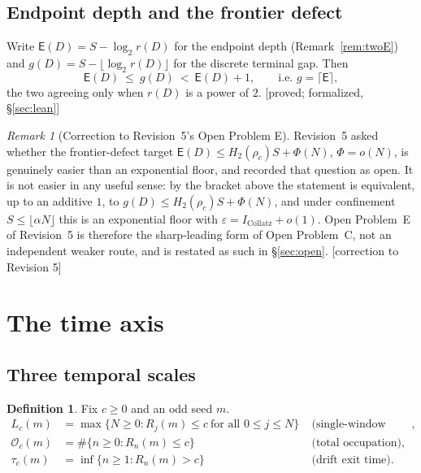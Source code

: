 \documentclass[11pt]{article}
\theoremstyle{plain}
\theoremstyle{definition}
\newtheorem{definition}[theorem]{Definition}
\theoremstyle{remark}
\newtheorem{remark}[theorem]{Remark}
\newcommand{\Occ}{\mathcal{O}}
\newcommand{\Edep}{\mathsf{E}}          %
\newcommand{\al}{\alpha}
\newcommand{\status}[1]{\textsf{\footnotesize[#1]}}
\begin{document}
\subsection{Endpoint depth and the frontier defect}\label{sec:gap}

Write $\Edep(D)=S-\log_2 r(D)$ for the endpoint depth (Remark~\ref{rem:twoE}) and
$g(D)=S-\lfloor\log_2 r(D)\rfloor$ for the discrete terminal gap. Then
\[
\Edep(D)\ \le\ g(D)\ <\ \Edep(D)+1,\qquad\text{i.e. } g=\lceil \Edep\rceil ,
\]
the two agreeing only when $r(D)$ is a power of $2$. \status{proved; formalized, \S\ref{sec:lean}}

\begin{remark}[Correction to Revision~5's Open Problem E]\label{rem:OPE}
Revision~5 asked whether the frontier-defect target
$\Edep(D)\le H_2(\rho_c)S+\Phi(N)$, $\Phi=o(N)$, is genuinely easier than an exponential floor, and
recorded that question as open. It is not easier in any useful sense: by the bracket above the
statement is equivalent, up to an additive $1$, to $g(D)\le H_2(\rho_c)S+\Phi(N)$, and under
confinement $S\le\lfloor\al N\rfloor$ this is an exponential floor with
$\varepsilon=I_{\mathrm{Collatz}}+o(1)$. Open Problem~E of Revision~5 is therefore the
sharp-leading form of Open Problem~C, not an independent weaker route, and is restated as such in
\S\ref{sec:open}. \status{correction to Revision 5}
\end{remark}

\section{The time axis}\label{sec:time}

\subsection{Three temporal scales}

\begin{definition}\label{def:times}
Fix $c\ge0$ and an odd seed $m$.
\begin{align*}
L_c(m)&=\max\{N\ge0: R_j(m)\le c\ \text{for all }0\le j\le N\} &&\text{(single-window lifetime)},\\
\Occ_c(m)&=\#\{n\ge0:R_n(m)\le c\} &&\text{(total occupation)},\\
\tau_c(m)&=\inf\{n\ge1:R_n(m)>c\} &&\text{(drift exit time)} .
\end{align*}
\end{definition}
\end{document}
